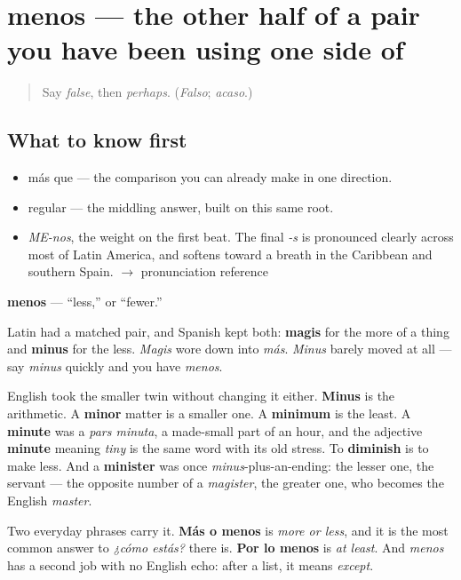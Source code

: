 \section[menos]{menos — the other half of a pair you have been using one side of}

\label{lesson:ES-C324-menos}



\begin{quote}
Say \emph{false}, then \emph{perhaps}. (\emph{Falso}; \emph{acaso}.)
\end{quote}

\subsection*{What to know first}
\begin{itemize}
\raggedright
  \item más que — the comparison you can already make in one direction.
  \item regular — the middling answer, built on this same root.
\end{itemize}

\begin{sounds}
\begin{itemize}
\raggedright
  \item \emph{ME-nos}, the weight on the first beat. The final \emph{-s} is pronounced clearly across most of Latin America, and softens toward a breath in the Caribbean and southern Spain. $\to$ pronunciation reference
\end{itemize}
\end{sounds}

\begin{cousinweb}
\textbf{menos} — \textquotedblleft{}less,\textquotedblright{} or \textquotedblleft{}fewer.\textquotedblright{}

Latin had a matched pair, and Spanish kept both: \textbf{magis} for the more of a thing and \textbf{minus} for the less. \emph{Magis} wore down into \emph{más}. \emph{Minus} barely moved at all — say \emph{minus} quickly and you have \emph{menos}.

English took the smaller twin without changing it either. \textbf{Minus} is the arithmetic. A \textbf{minor} matter is a smaller one. A \textbf{minimum} is the least. A \textbf{minute} was a \emph{pars minuta}, a made-small part of an hour, and the adjective \textbf{minute} meaning \emph{tiny} is the same word with its old stress. To \textbf{diminish} is to make less. And a \textbf{minister} was once \emph{minus}-plus-an-ending: the lesser one, the servant — the opposite number of a \emph{magister}, the greater one, who becomes the English \emph{master}.

Two everyday phrases carry it. \textbf{Más o menos} is \emph{more or less}, and it is the most common answer to \emph{¿cómo estás?} there is. \textbf{Por lo menos} is \emph{at least}. And \emph{menos} has a second job with no English echo: after a list, it means \emph{except}.
\end{cousinweb}

